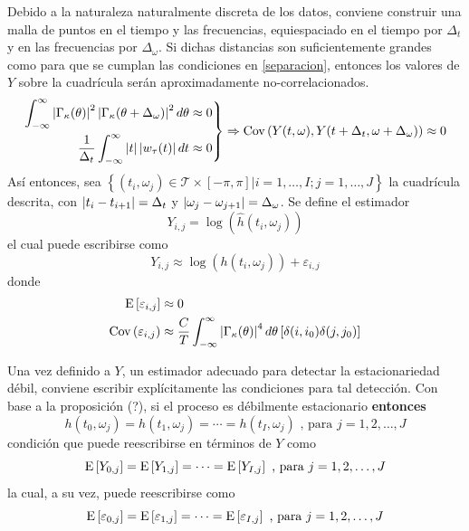 Debido a la naturaleza naturalmente discreta de los datos, conviene construir una malla de puntos en el tiempo y las frecuencias, equiespaciado en el tiempo por $\Delta_t$ y en las frecuencias por $\Delta_\omega$.
%
Si dichas distancias son suficientemente grandes
como para que se cumplan las condiciones en \ref{separacion}, entonces los valores de $Y$
sobre la cuadrícula serán aproximadamente no-correlacionados.
%
\begin{equation}
\left.
\begin{aligned}
\int_{-\infty}^{\infty} \left| \Gamma_\kappa(\theta) \right|^{2}\left| \Gamma_\kappa(\theta+\Delta_\omega) \right|^{2} d\theta 
&\approx 0 \\
\frac{1}{\Delta_t} \int_{-\infty}^{\infty} \left| t \right| \left| w_\tau (t) \right| dt &\approx 0
\end{aligned}
\right\rbrace
\Rightarrow
\mathrm{Cov}\left( Y(t,\omega),Y(t+\Delta_t,\omega+\Delta_\omega) \right) \approx 0
\label{separacion}
\end{equation}
%
Así entonces, sea
$\left\{ (t_i,\omega_j) \in \mathcal{T} \times [-\pi,\pi] | i = 1,\dots,I ; j=1,\dots,J \right\}$
la cuadrícula descrita, con $\left| t_i - t_{i+1} \right|= \Delta_t$ y 
$\left| \omega_j-\omega_{j+1} \right|= \Delta_\omega$. 
%
Se define el estimador
\begin{equation}
Y_{i,j} = \log\left(\widehat{h}(t_i,\omega_j)\right)
\end{equation}
%
el cual puede escribirse como
\begin{equation}
Y_{i,j} \approx \log\left(h(t_i,\omega_j)\right) + \varepsilon_{i,j}
\label{def:ye}
\end{equation}
donde
\begin{align}
\mathrm{E}\left[ \varepsilon_{i,j} \right] &\approx 0 \\
\mathrm{Cov}\left( \varepsilon_{i,j} \right) &\approx
\frac{C}{T} \int_{-\infty}^{\infty} \left| \Gamma_\kappa(\theta) \right|^{4} d\theta \left[ \delta(i,i_0)\delta(j,j_0) \right]
\end{align}

Una vez definido a $Y$, un estimador adecuado para detectar la estacionariedad débil, conviene escribir explícitamente las condiciones para tal detección.
%
Con base a la proposición (?), si el proceso \xt es débilmente estacionario \textbf{entonces}
%
\begin{equation}
h(t_0,\omega_j) = h(t_1,\omega_j) = \cdots = h(t_I,\omega_j) \text{ , para } j = 1, 2, \dots , J
\label{h1}
\end{equation}
condición que puede reescribirse en términos de $Y$ como
%
\begin{equation}
\mathrm{E}\left[ Y_{0,j} \right] = \mathrm{E}\left[ Y_{1,j} \right] = \cdots = \mathrm{E}\left[ Y_{I,j} \right] \text{ , para } j = 1, 2, \dots , J
\label{h2}
\end{equation}
%
la cual, a su vez, puede reescribirse como
\begin{equation}
\mathrm{E}\left[ \varepsilon_{0,j} \right] = \mathrm{E}\left[ \varepsilon_{1,j} \right] = \cdots = \mathrm{E}\left[ \varepsilon_{I,j} \right] \text{ , para } j = 1, 2, \dots , J
\label{h3}
\end{equation}

